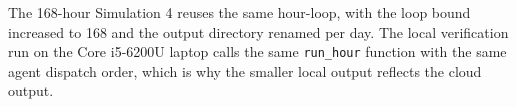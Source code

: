 The 168-hour Simulation 4 reuses the same hour-loop, with the loop
bound increased to 168 and the output directory renamed per day. The
local verification run on the Core i5-6200U laptop calls the same
\texttt{run\_hour} function with the same agent dispatch order, which
is why the smaller local output reflects the cloud output.
